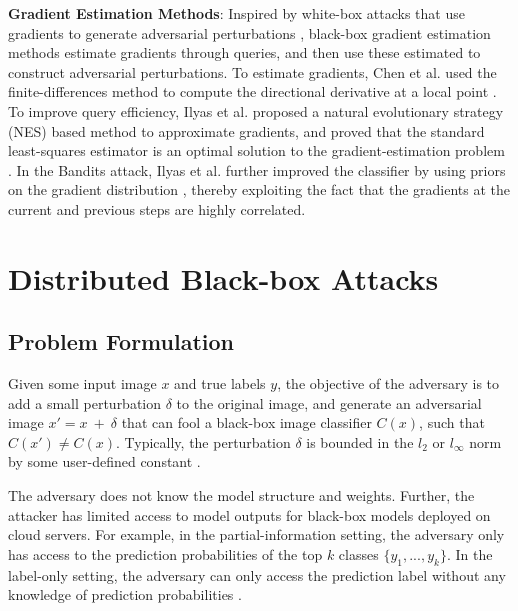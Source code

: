 \textbf{Gradient Estimation Methods}: Inspired by white-box attacks that use gradients to generate adversarial perturbations \cite{GoodfellowSS14} \cite{madry2017towards}, black-box gradient estimation methods estimate gradients through queries, and then use these estimated to construct adversarial perturbations. To estimate gradients, Chen et al. used the finite-differences method to compute the directional derivative at a local point \cite{chen2017zoo}. To improve query efficiency, Ilyas et al. proposed a natural evolutionary strategy (NES) \cite{wierstra2014nes} based method to approximate gradients, and proved that the standard least-squares estimator is an optimal solution to the gradient-estimation problem \cite{ilyas2018black}. In the Bandits attack, Ilyas et al. further improved the classifier by using priors on the gradient distribution \cite{ilyas2018prior}, thereby exploiting the fact that the gradients at the current and previous steps are highly correlated.



\section{Distributed Black-box Attacks}

\subsection{Problem Formulation}

Given some input image $x$ and true labels $y$, the objective of the adversary is to add a small perturbation $\delta$ to the original image, and generate an adversarial image $x' = x\ +\ \delta$ that can fool a black-box image classifier $C(x)$, such that $C(x') \neq C(x)$. Typically, the perturbation $\delta$ is bounded in the $l_2$ or $l_\infty$ norm by some user-defined constant \cite{bhambri2019survey}.

The adversary does not know the model structure and weights. Further, the attacker has limited access to model outputs for black-box models deployed on cloud servers. For example, in the partial-information setting, the adversary only has access to the prediction probabilities of the top $k$ classes $\{y_1, ..., y_k\}$. In the label-only setting, the adversary can only access the prediction label without any knowledge of prediction probabilities \cite{ilyas2018black}.

